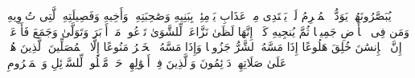 \stopbuffer%
\startbuffer[\q:70:11]
یُبَصَّرُونَهُمۡۚ یَوَدُّ ٱلۡمُجۡرِمُ لَوۡ یَفۡتَدِی مِنۡ عَذَابِ یَوۡمِئِذِۭ بِبَنِیهِ%
\stopbuffer%
\startbuffer[\q:70:12]
وَصَٰحِبَتِهِۦ وَأَخِیهِ%
\stopbuffer%
\startbuffer[\q:70:13]
وَفَصِیلَتِهِ ٱلَّتِی تُءۡوِیهِ%
\stopbuffer%
\startbuffer[\q:70:14]
وَمَن فِی ٱلۡأَرۡضِ جَمِیعࣰا ثُمَّ یُنجِیهِ%
\stopbuffer%
\startbuffer[\q:70:15]
كَلَّاۤۖ إِنَّهَا لَظَىٰ%
\stopbuffer%
\startbuffer[\q:70:16]
نَزَّاعَةࣰ لِّلشَّوَىٰ%
\stopbuffer%
\startbuffer[\q:70:17]
تَدۡعُوا۟ مَنۡ أَدۡبَرَ وَتَوَلَّىٰ%
\stopbuffer%
\startbuffer[\q:70:18]
وَجَمَعَ فَأَوۡعَىٰۤ%
\stopbuffer%
\startbuffer[\q:70:19]
۞ إِنَّ ٱلۡإِنسَٰنَ خُلِقَ هَلُوعًا%
\stopbuffer%
\startbuffer[\q:70:20]
إِذَا مَسَّهُ ٱلشَّرُّ جَزُوعࣰا%
\stopbuffer%
\startbuffer[\q:70:21]
وَإِذَا مَسَّهُ ٱلۡخَیۡرُ مَنُوعًا%
\stopbuffer%
\startbuffer[\q:70:22]
إِلَّا ٱلۡمُصَلِّینَ%
\stopbuffer%
\startbuffer[\q:70:23]
ٱلَّذِینَ هُمۡ عَلَىٰ صَلَاتِهِمۡ دَاۤئِمُونَ%
\stopbuffer%
\startbuffer[\q:70:24]
وَٱلَّذِینَ فِیۤ أَمۡوَٰلِهِمۡ حَقࣱّ مَّعۡلُومࣱ%
\stopbuffer%
\startbuffer[\q:70:25]
لِّلسَّاۤئِلِ وَٱلۡمَحۡرُومِ%
\stopbuffer%
